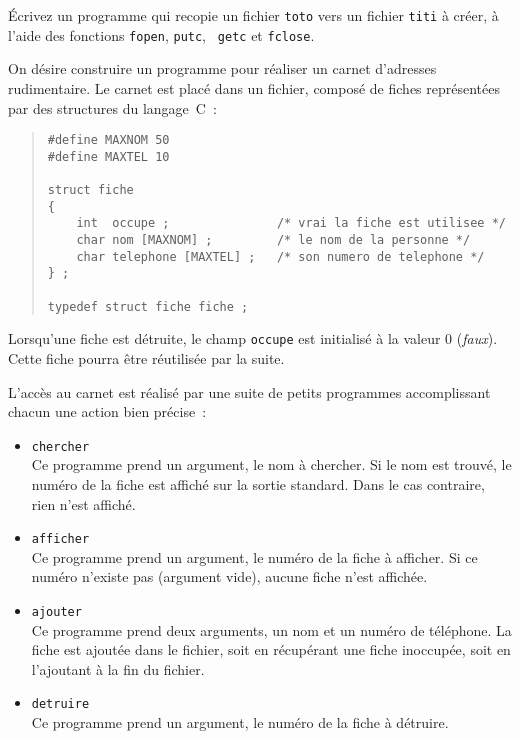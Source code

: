 %




% 


\question

Écrivez un programme qui recopie un fichier {\tt toto} vers un fichier
{\tt titi} à créer, à l'aide des fonctions {\tt fopen}, {\tt putc}, {\tt
getc} et {\tt fclose}.


\question

On désire construire un programme pour réaliser un carnet d'adresses
rudimentaire.  Le carnet est placé dans un fichier, composé de
fiches représentées par des structures du langage~C~:

\begin {quote}
\small
\begin {verbatim}
#define MAXNOM 50
#define MAXTEL 10

struct fiche
{
    int  occupe ;               /* vrai la fiche est utilisee */
    char nom [MAXNOM] ;         /* le nom de la personne */
    char telephone [MAXTEL] ;   /* son numero de telephone */
} ;

typedef struct fiche fiche ;
\end{verbatim}
\end {quote}

Lorsqu'une fiche est détruite, le champ {\tt occupe} est initialisé à la
valeur 0 ({\em faux}). Cette fiche pourra être réutilisée par la suite.

L'accès au carnet est réalisé par une suite de petits programmes
accomplissant chacun une action bien précise~:

\begin {itemize}
    \item {\tt chercher} \\
	Ce programme prend un argument, le nom à chercher. Si le nom est
	trouvé, le numéro de la fiche est affiché sur la sortie
	standard. Dans le cas contraire, rien n'est affiché.
    \item {\tt afficher} \\
	Ce programme prend un argument, le numéro de la fiche à
	afficher. Si ce numéro n'existe pas (argument vide), aucune
	fiche n'est affichée.
    \item {\tt ajouter} \\
	Ce programme prend deux arguments, un nom et un numéro de
	téléphone. La fiche est ajoutée dans le fichier, soit en
	récupérant une fiche inoccupée, soit en l'ajoutant à la fin du
	fichier.
    \item {\tt detruire} \\
	Ce programme prend un argument, le numéro de la fiche à
	détruire.
\end {itemize}


